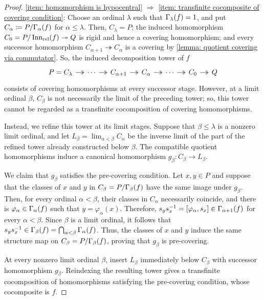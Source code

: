 \begin{proof}
\ref{item: homomorphism is hypocentral} $\Rightarrow$ \ref{item: transfinite cocomposite of covering condition}:
Choose an ordinal $\lambda$ such that $\Gamma_{\lambda}(f)=1$, and put $C_\alpha\coloneqq P/\Gamma_{\alpha}(f)$ for $\alpha\leq\lambda$.
Then, $C_\lambda=P$; the induced homomorphism $C_0=P/\operatorname{Inn_{rel}}(f)\twoheadrightarrow Q$ is rigid and hence a covering homomorphism; and every successor homomorphism $C_{\alpha+1}\twoheadrightarrow C_\alpha$ is a covering by \cref{lemma: quotient covering via commutator}.
So, the induced decomposition tower of $f$
\[\begin{tikzcd}[column sep=small]
P=C_\lambda \arrow[two heads]{r} &
\cdots \arrow[two heads]{r} &
C_{\alpha+1} \arrow[two heads]{r} &
C_{\alpha} \arrow[two heads]{r} &
\cdots \arrow[two heads]{r} &
C_0 \arrow[two heads]{r} & Q
\end{tikzcd}\]
consists of covering homomorphisms at every successor stage. However, at a limit ordinal $\beta$, $C_\beta$ is not necessarily the limit of the preceding tower; so, this tower cannot be regarded as a transfinite cocomposition of covering homomorphisms.

Instead, we refine this tower at its limit stages. Suppose that $\beta\leq\lambda$ is a nonzero limit ordinal, and let $\textstyle L_\beta = \lim_{\alpha<\beta} C_{\alpha}$ be the inverse limit of the part of the refined tower already constructed below $\beta$. The compatible quotient homomorphisms induce a canonical homomorphism $g_\beta\colon C_\beta\to L_\beta$.

We claim that $g_\beta$ satisfies the pre-covering condition. Let $x,y\in P$ and suppose that the classes of $x$ and $y$ in $C_\beta=P/\Gamma_{\beta}(f)$ have the same image under $g_\beta$. Then, for every ordinal $\alpha<\beta$, their classes in $C_\alpha$ necessarily coincide, and there is $\varphi_\alpha\in\Gamma_{\alpha}(f)$ such that $y=\varphi_\alpha(x)$. Therefore, $s_ys_x^{-1} = [\varphi_\alpha,s_x] \in \Gamma_{\alpha+1}(f)$ for every $\alpha<\beta$. Since $\beta$ is a limit ordinal, it follows that $\textstyle s_ys_x^{-1}\in\Gamma_{\beta}(f)=\bigcap_{\alpha<\beta}\Gamma_{\alpha}(f)$. Thus, the classes of $x$ and $y$ induce the same structure map on $C_\beta=P/\Gamma_{\beta}(f)$, proving that $g_\beta$ is pre-covering.

At every nonzero limit ordinal $\beta$, insert $L_\beta$ immediately below $C_\beta$ with successor homomorphism $g_\beta$. Reindexing the resulting tower gives a transfinite cocomposition of homomorphisms satisfying the pre-covering condition, whose cocomposite is $f$.


\end{proof}
